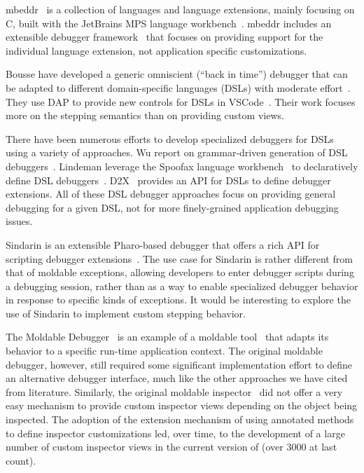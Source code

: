 \documentclass[sigplan,10pt]{acmart}
\newcommand{\GT}{\lst{GT}\xspace} %
\begin{document}
mbeddr~\cite{Voel17a} is a collection of languages and language extensions, mainly focusing on C, built with the JetBrains MPS language workbench~\cite{Camp14a}.
mbeddr includes an extensible debugger framework~\cite{Pavl15a} that focuses on providing support for the individual language extension, not application specific customizations.

Bousse \etal have developed a generic omniscient (``back in time'') debugger that can be adapted to different domain-specific languages (DSLs) with moderate effort~\cite{Bous18a}.
They use DAP to provide new controls for DSLs in VSCode~\cite{Enet23a}.
Their work focuses more on the stepping semantics than on providing custom views.

There have been numerous efforts to develop specialized debuggers for DSLs using a variety of approaches.
Wu \etal report on grammar-driven generation of DSL debuggers~\cite{HuiW08a}.
Lindeman \etal leverage the Spoofax language workbench~\cite{Kats10a} to declaratively define DSL debuggers~\cite{Lind11a}.
D2X~\cite{Brah23a} provides an API for DSLs to define debugger extensions.
All of these DSL debugger approaches focus on providing general debugging for a given DSL, not for more finely-grained application debugging issues.

Sindarin is an extensible Pharo-based debugger that offers a rich API for scripting debugger extensions~\cite{Dupr19a}.
The use case for Sindarin is rather different from that of moldable exceptions, allowing developers to enter debugger scripts during a debugging session, rather than as a way to enable specialized debugger behavior in response to specific kinds of exceptions.
It would be interesting to explore the use of Sindarin to implement custom stepping behavior.

The Moldable Debugger~\cite{Chis15c} is an example of a moldable tool~\cite{Chis17a} that adapts its behavior to a specific run-time application context.
The original moldable debugger, however, still required some significant implementation effort to define an alternative debugger interface, much like the other approaches we have cited from literature.
Similarly, the original moldable inspector~\cite{Chis15a} did not offer a very easy mechanism to provide custom inspector views depending on the object being inspected.
The adoption of the extension mechanism of using annotated methods to define inspector customizations led, over time, to the development of a large number of custom inspector views in the current version of \GT (over 3000 at last count).
\end{document}
